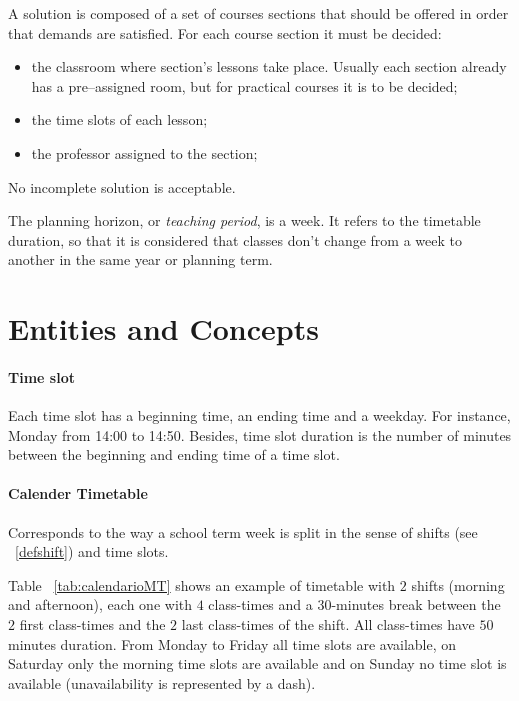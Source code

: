 A solution is composed of a set of courses sections that should be offered in order that demands are satisfied. For each course section it must be decided:

\begin{itemize}
\item the classroom where section's lessons take place. Usually each section already has a pre--assigned room, but for practical courses it is to be decided;
\item the time slots of each lesson;
\item the professor assigned to the section;
\end{itemize}

No incomplete solution is acceptable.

The planning horizon, or \textit{teaching period}, is a week. It refers to the timetable duration, so that it is considered that classes don't change from a week to another in the same year or planning term.
 



\section{Entities and Concepts}
\label{sec:entities}


\paragraph{Time slot}
\label{deftimeslot}

Each time slot has a beginning time, an ending time and a weekday. For instance, Monday from 14:00 to 14:50. Besides, time slot duration is the number of minutes between the beginning and ending time of a time slot.


\paragraph{Calender Timetable}
\label{deftimetable}

Corresponds to the way a school term week is split in the sense of shifts (see ~\ref{defshift}) and time slots.

Table ~\ref{tab:calendarioMT} shows an example of timetable with $2$ shifts (morning and afternoon), each one with $4$ class-times and a 30-minutes break between the $2$ first class-times and the $2$ last class-times of the shift. All class-times have $50$ minutes duration. From Monday to Friday all time slots are available, on Saturday only the morning time slots are available and on Sunday no time slot is available (unavailability is represented by a dash).

